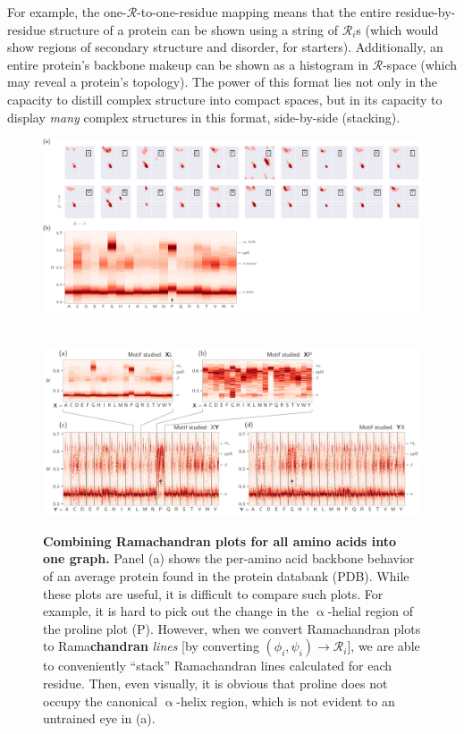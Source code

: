 \documentclass[fleqn,10pt,lineno]{wlpeerj} %
\newcommand{\n}[1]{{\textbf{\color{red}#1}}}
\begin{document}
For example, the one-$\mathcal{R}$-to-one-residue mapping means that the entire residue-by-residue structure of a protein can be shown using a string of $\mathcal{R}_i$s (which would show regions of secondary structure and disorder, for starters). Additionally, an entire protein's backbone makeup can be shown as a histogram in $\mathcal{R}$-space (which may reveal a protein's topology). The power of this format lies not only in the capacity to distill complex structure into compact spaces, but in its capacity to display {\it many} complex structures in this format, side-by-side (stacking).

\begin{figure}
\begin{adjustwidth}{-1in}{0in} %
\centering
\includegraphics[width=1.00\linewidth]{automated_figures/fig_ramachandran_plots_vs_numbers.pdf}
\caption{\textbf{\n{Combining Ramachandran plots for all amino acids into one graph.}}  
Panel (a) shows the per-amino acid backbone behavior of an average protein found in the protein databank (PDB). While these plots are useful, it is difficult to compare such plots. For example, it is hard to pick out the change in the $\upalpha$-helial region of the proline plot (P). However, when we convert Ramachandran plots to Rama\n{chandran} \textit{lines} [by converting $(\phi_i,\psi_i)\to\mathcal{R}_i$], we are able to conveniently ``stack'' Ramachandran lines calculated for each residue. Then, even visually, it is obvious that proline does not occupy the canonical $\upalpha$-helix region, which is not evident to an untrained eye in (a).\label{fig:peraa}}
~\vfill~
\includegraphics[width=1.00\linewidth]{automated_figures/fig_ramachandran_numbers_are_useful1.pdf}

\end{adjustwidth}
\end{figure}
\end{document}
